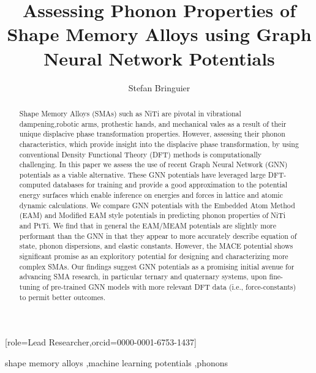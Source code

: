 \documentclass[preprint]{elsarticle}
\begin{document}
\title{Assessing Phonon Properties of Shape Memory Alloys using Graph Neural Network Potentials}

\author[1]{Stefan Bringuier}[role=Lead Researcher,orcid=0000-0001-6753-1437]

\begin{abstract}
Shape Memory Alloys (SMAs) such as NiTi are pivotal in vibrational dampening,robotic arms, prothestic hands, and mechanical vales as a result of their unique displacive phase transformation properties. However, assessing their phonon characteristics, which provide insight into the displacive phase transformation, by using conventional Density Functional Theory (DFT) methods is computationally challenging. In this paper we assess the use of recent Graph Neural Network (GNN) potentials as a viable alternative. These GNN potentials have leveraged large DFT-computed databases for training and provide a good approximation to the potential energy surfaces which enable inference on energies and forces in lattice and atomic dynamic calculations. We compare GNN potentials with the Embedded Atom Method (EAM) and Modified EAM style potentials in predicting phonon properties of NiTi and PtTi. We find that in general the EAM/MEAM potentials are slightly more performant than the GNN in that they appear to more accurately describe equation of state, phonon dispersions, and elastic constants. However, the MACE potential shows significant promise as an exploritory potential for designing and characterizing more complex SMAs. Our findings suggest GNN potentials as a promising initial avenue for advancing SMA research, in particular ternary and quaternary systems, upon fine-tuning of pre-trained GNN models with more relevant DFT data (i.e., force-constants) to permit better outcomes.   
\end{abstract}

\begin{keyword}
  shape memory alloys \sep machine learning potentials \sep phonons
\end{keyword}


\maketitle

\end{document}

